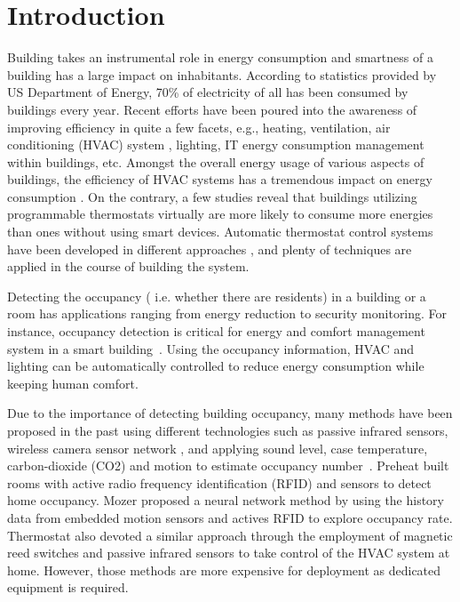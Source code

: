 \section{Introduction}
Building takes an instrumental role in energy consumption and
smartness of a building has a large impact on inhabitants. According
to statistics provided by US Department of Energy, 70\% of electricity
of all has been consumed by buildings every year. Recent efforts have
been poured into the awareness of improving efficiency in quite a few
facets, e.g., heating, ventilation, air conditioning (HVAC) system
\cite{10}\cite{12}, lighting\cite{8}, IT energy consumption management
within buildings\cite{1}\cite{2}, etc. Amongst the overall energy
usage of various aspects of buildings, the efficiency of HVAC systems
has a tremendous impact on energy consumption \cite{83}. On the
contrary, a few studies \cite{86} reveal that buildings utilizing
programmable thermostats virtually are more likely to consume more
energies than ones without using smart devices. Automatic thermostat
control systems have been developed in different approaches
\cite{87}\cite{88}, and plenty of techniques are applied in the course
of building the system.

Detecting the occupancy ( i.e. whether there are residents) in a
building or a room has applications ranging from energy reduction
to security monitoring.
For instance, occupancy detection is critical for energy and comfort management
system in a smart building~\cite{Nguyen:energy13}.
Using the occupancy information, HVAC and lighting can be
automatically controlled to reduce energy consumption while keeping
human comfort.

Due to the importance of detecting building occupancy, many methods
have been proposed in the past using different technologies such as passive infrared sensors\cite{Dodier:energy06},  wireless camera sensor network \cite{Kamthe:EWSN09}, and applying sound level,
case temperature, carbon-dioxide (CO2) and motion to estimate
occupancy number~\cite{Ekwevugbe:DEST13}.  
Preheat \cite{8.10} built rooms with active radio frequency
identification (RFID) and sensors to detect home occupancy. Mozer
\cite{8.9} proposed a neural network method by using the history data
from embedded motion sensors and actives RFID to explore occupancy
rate. Thermostat \cite{8.11} also devoted a similar approach through
the employment of magnetic reed switches and passive infrared sensors
to take control of the HVAC system at home. However, those methods are
more expensive for deployment as dedicated equipment is required.

